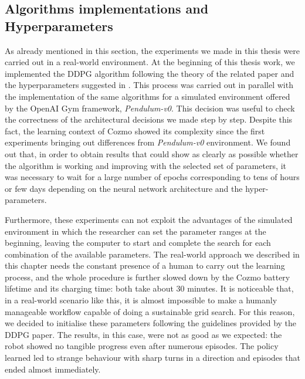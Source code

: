 \subsection{Algorithms implementations and Hyperparameters}

As already mentioned in this section, the experiments we made in this thesis were carried out in a real-world environment.
At the beginning of this thesis work, we implemented the DDPG algorithm following the theory of the related paper and the hyperparameters suggested in \cite{lillicrap2015continuous,kendall2018learning,kendall2019learning}.
This process was carried out in parallel with the implementation of the same algorithms for a simulated environment offered by the OpenAI Gym framework, \textit{Pendulum-v0}.
This decision was useful to check the correctness of the architectural decisions we made step by step.
Despite this fact, the learning context of Cozmo showed its complexity since the first experiments bringing out differences from \textit{Pendulum-v0} environment.
We found out that, in order to obtain results that could show as clearly as possible whether the algorithm is working and improving with the selected set of parameters, it was necessary to wait for a large number of epochs corresponding to tens of hours or few days depending on the neural network architecture and the hyper-parameters.

Furthermore, these experiments can not exploit the advantages of the simulated environment in which the researcher can set the parameter ranges at the beginning, leaving the computer to start and complete the search for each combination of the available parameters.
The real-world approach we described in this chapter needs the constant presence of a human to carry out the learning process, and the whole procedure is further slowed down by the Cozmo battery lifetime and its charging time: both take about 30 minutes.
It is noticeable that, in a real-world scenario like this, it is almost impossible to make a humanly manageable workflow capable of doing a sustainable grid search.
For this reason, we decided to initialise these parameters following the guidelines provided by the DDPG paper.
The results, in this case, were not as good as we expected: the robot showed no tangible progress even after numerous episodes.
The policy learned led to strange behaviour with sharp turns in a direction and episodes that ended almost immediately.

